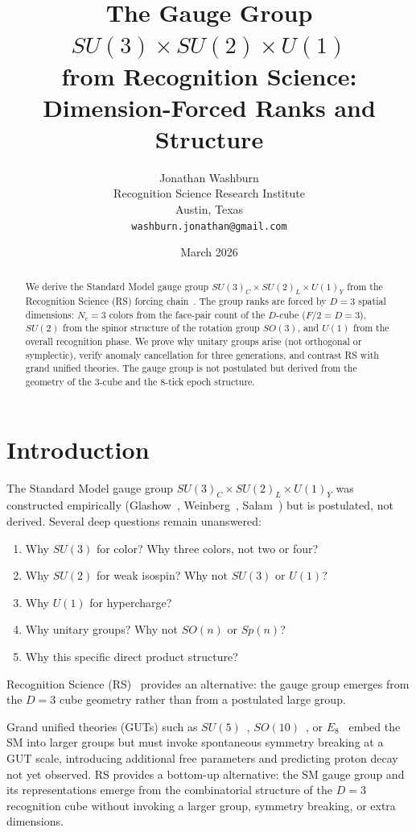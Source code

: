 \documentclass[12pt,a4paper]{article}
\title{The Gauge Group
$SU(3) \times SU(2) \times U(1)$\\
from Recognition Science:\\
Dimension-Forced Ranks and Structure}
\author{Jonathan Washburn\\
Recognition Science Research Institute\\
Austin, Texas\\
\texttt{washburn.jonathan@gmail.com}}
\date{March 2026}
\theoremstyle{definition}
\theoremstyle{remark}
\begin{document}
\maketitle

\begin{abstract}
We derive the Standard Model gauge group
$SU(3)_C \times SU(2)_L \times U(1)_Y$ from the Recognition
Science (RS) forcing chain~\cite{RS_Axioms}.  The group ranks are
forced by $D = 3$ spatial dimensions: $N_c = 3$ colors from the
face-pair count of the $D$-cube ($F/2 = D = 3$), $SU(2)$ from the
spinor structure of the rotation group $SO(3)$, and $U(1)$ from
the overall recognition phase.  We prove why unitary groups
arise (not orthogonal or symplectic), verify anomaly
cancellation for three generations, and contrast RS with grand
unified theories.  The gauge group is not postulated but derived
from the geometry of the 3-cube and the 8-tick epoch structure.
\end{abstract}

\section{Introduction}
\label{sec:intro}

The Standard Model gauge group
$SU(3)_C \times SU(2)_L \times U(1)_Y$ was constructed
empirically (Glashow~\cite{Glashow1961},
Weinberg~\cite{Weinberg1967},
Salam~\cite{Salam1968}) but is postulated, not derived.
Several deep questions remain unanswered:
\begin{enumerate}
  \item Why $SU(3)$ for color?  Why three colors, not two or
  four?
  \item Why $SU(2)$ for weak isospin?  Why not $SU(3)$ or
  $U(1)$?
  \item Why $U(1)$ for hypercharge?
  \item Why unitary groups?  Why not $SO(n)$ or $Sp(n)$?
  \item Why this specific direct product structure?
\end{enumerate}

Recognition Science (RS)~\cite{RS_Axioms} provides an alternative:
the gauge group emerges from the $D=3$ cube geometry rather than
from a postulated large group.

Grand unified theories (GUTs) such as
$SU(5)$~\cite{GeorgiGlashow1974},
$SO(10)$~\cite{Georgi1975}, or $E_8$~\cite{Lisi2007} embed
the SM into larger groups but must invoke spontaneous symmetry
breaking at a GUT scale, introducing additional free parameters
and predicting proton decay not yet observed.  RS provides a
bottom-up alternative: the SM gauge group and its representations
emerge from the combinatorial structure of the $D = 3$ recognition
cube without invoking a larger group, symmetry breaking, or extra
dimensions.
\end{document}
